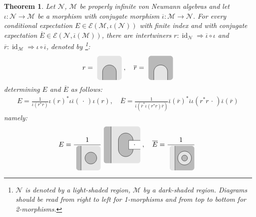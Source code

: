 \documentclass[11pt,a4paper]{article}
\newcommand{\rbar}{{\overline{r}}}
\newcommand{\iotabar}{{\overline{\iota}}}
\newcommand{\Ebar}{{\overline{E}}}
\newcommand{\slot}{{\,\cdot \,}}
\newcommand{\E}{\mathcal{E}}
\newcommand{\M}{\mathcal{M}}
\newcommand{\N}{\mathcal{N}}
\DeclareMathOperator{\id}{id}
\theoremstyle{plain}
\newtheorem{thm}{Theorem}[section]
\theoremstyle{definition}
\theoremstyle{remark}
\numberwithin{equation}{section}%
\newcommand{\colN}{gray!20}
\newcommand{\colM}{gray!55}
\newcommand{\tikzmath}[2][]
     {\vcenter{\hbox{
     \begin{tikzpicture}[#1]#2
     \end{tikzpicture}}}
     }
\begin{document}
\begin{thm}\label{thm:EEbarandconjeqns}
Let $\N$, $\M$ be properly infinite von Neumann algebras and let $\iota:\N\to\M$ be a morphism with conjugate morphism $\iotabar: \M\to\N$. 
For every conditional expectation $E\in \E(\M,\iota(\N))$ with finite index and with conjugate expectation $\Ebar \in \E(\N,\iotabar(\M))$, there are intertwiners
$r : \id_\N \Rightarrow \iotabar\circ\iota$ and $\rbar : \id_\M \Rightarrow \iota\circ\iotabar$, denoted by \footnote{$\N$ is denoted by a light-shaded region, $\M$ by a dark-shaded region. Diagrams should be read from right to left for 1-morphisms and from top to bottom for 2-morphisms.}:
\begin{align}
r = \tikzmath[scale=.5]{
\fill[\colN,rounded corners] (-1,-1.25) rectangle (1.5,1.25);
\draw[fill = \colM] (-.45,-1.25) -- (-.45,-.4) arc (180:0:.7) -- (.95,-1.25);
}\;,
\quad
\rbar = \tikzmath[scale=.5]{
\fill[\colM,rounded corners] (-1,-1.25) rectangle (1.5,1.25);
\draw[fill = \colN] (-.45,-1.25) -- (-.45,-.4) arc (180:0:.7) -- (.95,-1.25);
}
\end{align}
determining $E$ and $\Ebar$ as follows:
\begin{align}\label{eq:EEbarstine}
E = \frac{1}{\iota(r^*r)} \iota(r)^* \iota\iotabar (\slot) \iota(r), \quad \Ebar = \frac{1}{\iotabar(\rbar^* \iota(r^*r)\rbar)} \iotabar(\rbar)^* \iotabar\iota (r^*r \slot) \iotabar(\rbar)
\end{align}
namely:
\begin{align}
E =
\frac{1}{\tikzmath[scale=.5]{
\fill[\colN,rounded corners] (-1,-1.25) rectangle (1.5,1.25);
\clip[rounded corners] (-1,-1.25) rectangle (1.5,1.25);
\fill[\colM] (-1,-1.25) rectangle (-.5,1.25);
\draw (-.5,-1.25) -- (-.5,1.25);
\draw[fill = \colM] (.5,0) circle (.6);
}}
\tikzmath[scale=.75]{
\fill[\colN,rounded corners] (-1,-1.25) rectangle (1.5,1.25);
\clip[rounded corners] (-1,-1.25) rectangle (1.5,1.25);
\fill[\colM] (-1,-1.25) rectangle (-.5,1.25);
\draw (-.5,-1.25) -- (-.5,1.25);
\draw[fill = \colM] (1,-.25) -- (1,-.3) arc (360:180:.5) -- (0,.3) arc (180:0:.5) -- (1,.25);
\fill[white] (1.5,-.3) -- (.7,-.3) -- (.7,.3) -- (1.5,.3);
\draw (1.5,-.3) -- (.7,-.3)--(.7,.3) -- (1.5,.3);
\draw (1.1,0) node {$\slot$};
}\;,
\quad
\Ebar =
\frac{1}{\tikzmath[scale=.5]{
\fill[\colM,rounded corners] (-1,-1.25) rectangle (1.5,1.25);
\clip[rounded corners] (-1,-1.25) rectangle (1.5,1.25);
\fill[\colN] (-1,-1.25) rectangle (-.5,1.25);
\draw (-.5,-1.25)--(-.5,1.25);
\draw[fill = \colN] (.5,0) circle (.7);
\draw[fill = \colM] (.5,0) circle (.3);
}}
\tikzmath[scale=.75]{
}
\end{align}
\end{thm}
\end{document}
